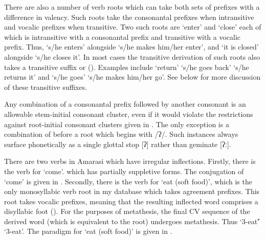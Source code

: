 There are also a number of verb roots which can take both
sets of prefixes with a difference in valency.
Such roots take the consonantal prefixes when
intransitive and vocalic prefixes when transitive.
Two such roots are  `enter' and  `close'
each of which is intransitive with a consonantal prefix
and transitive with a vocalic prefix.
Thus,  `s/he enters' alongside  `s/he makes him/her enter',
and  `it is closed' alongside  `s/he closes it'.
In most cases the transitive derivation of such roots also 
takes a transitive suffix  or  ().
Examples include  `return' {\ra} 
`s/he goes back' {\ra}  `s/he returns it'
and  {\ra}  `s/he goes' {\ra}  `s/he makes him/her go'.
See  below for more discussion of these transitive suffixes.

Any combination of a consonantal prefix followed
by another consonant is an allowable stem-initial consonant cluster,
even if it would violate the restrictions
against root-initial consonant clusters given in .
The only exception is a combination of
 before a root which begins with /ʔ/.
Such instances always surface phonetically
as a single glottal stop [ʔ] rather than geminate [ʔː].

There are two verbs in Amarasi which have irregular inflections.
Firstly, there is the verb for `come'.
which has partially suppletive forms.
The conjugation of `come' is given in .
Secondly, there is the verb for `eat (soft food)',
which is the only monosyllabic verb root in my
database which takes agreement prefixes.
This root takes vocalic prefixes, meaning that the resulting
inflected word comprises a disyllabic foot ().
For the purposes of metathesis, the final CV sequence of the derived
word (which is equivalent to the root) undergoes metathesis.
Thus  `3-eat\U' {\ra}  `3-eat\M'.
The paradigm for  `eat (soft food)' is given in .

